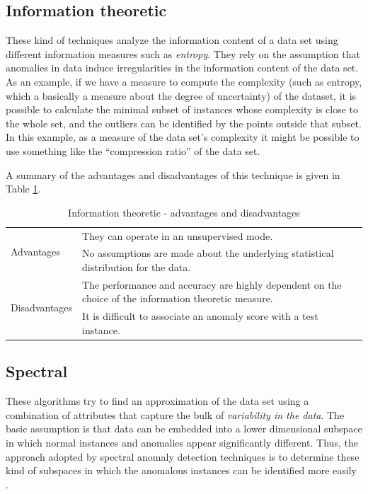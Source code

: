 \documentclass[12pt,a4paper,cucitura]{toptesi}
\begin{document}
\subsection{Information theoretic}

These kind of techniques analyze the information content of a data set using different information measures such as \emph{entropy}.
They rely on the assumption that anomalies in data induce irregularities in the information content of the data set.
As an example, if we have a measure to compute the complexity (such as entropy, which a basically a measure about the degree of uncertainty) of the dataset, it is possible to calculate the minimal subset of instances whose complexity is close to the whole set, and the outliers can be identified by the points outside that subset.
In this example, as a measure of the data set's complexity it might be possible to use something like the ``compression ratio'' of the data set.

A summary of the advantages and disadvantages of this technique is given in Table \ref{tab-information}.


\begin{table}
\centering
\begin{tabular}{l|p{12cm}}
\hline
\hline
\multirow{2}{*}{Advantages} & They can operate in an unsupervised mode. \\
\cline{2-2}
& No assumptions are made about the underlying statistical distribution for the data. \\ 
\hline
\multirow{2}{*}{Disadvantages} & The performance and accuracy are highly dependent on the choice of the information theoretic measure. \\
\cline{2-2}
& It is difficult to associate an anomaly score with a test instance. \\
\hline
\hline
\end{tabular}
\caption{Information theoretic - advantages and disadvantages}
\label{tab-information}
\end{table}

\subsection{Spectral}

These algorithms try to find an approximation of the data set using a combination of attributes that capture the bulk of \emph{variability in the data}. 
The basic assumption is that data can be embedded into a lower dimensional subspace in which normal instances and anomalies appear significantly different.
Thus, the approach adopted by spectral anomaly detection techniques is to determine these kind of subspaces in which the anomalous instances can be identified more easily \cite{pca2}.
\end{document}
